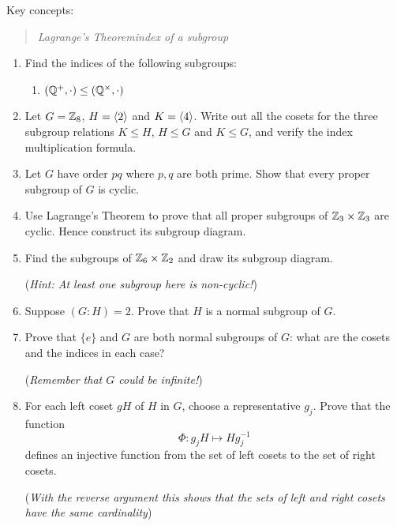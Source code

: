 \begin{exercises}
	Key concepts:
	\begin{quote}
		\emph{Lagrange's Theorem\qquad index of a subgroup}
	\end{quote}
	
	
	\begin{enumerate}
	  \item Find the indices of the following subgroups:
		\begin{enumerate}
	  	\item {}$(\mathbb{Q}^+,\cdot)\le(\mathbb{Q}^\times,\cdot)$
		\end{enumerate}


		\item Let $G=\mathbb{Z}_8$, $H=\left\langle 2\right\rangle$ and $K=\left\langle 4\right\rangle$. Write out all the cosets for the three subgroup relations $K\le H$, $H\le G$ and $K\le G$, and verify the index multiplication formula.
	  
	  
		\item Let $G$ have order $pq$ where $p,q$ are both prime. Show that every proper subgroup of $G$ is cyclic.
		
		
		\item Use Lagrange's Theorem to prove that all proper subgroups of $\mathbb{Z}_3\times\mathbb{Z}_3$ are cyclic. Hence construct its subgroup diagram.
		
		
		\item Find the subgroups of $\mathbb{Z}_6\times\mathbb{Z}_2$ and draw its subgroup diagram.\par
		(\emph{Hint: At least one subgroup here is \emph{non-cyclic}!})
		
		
		\item Suppose $(G:H)=2$. Prove that $H$ is a normal subgroup of $G$.
		
	  
	  \item Prove that $\{e\}$ and $G$ are both normal subgroups of $G$: what are the cosets and the indices in each case?\par
	  (\emph{Remember that $G$ could be infinite!})
	  
	  
	  \item\label{exs:indexcard} For each left coset $gH$ of $H$ in $G$, choose a representative $g_j$. Prove that the function
	  \[
	  	\Phi:g_jH\mapsto Hg_j^{-1}
	  \]
	  defines an injective function from the set of left cosets to the set of right cosets.\par
	  (\emph{With the reverse argument this shows that the sets of left and right cosets have the same cardinality})
		

\end{enumerate}
\end{exercises}
